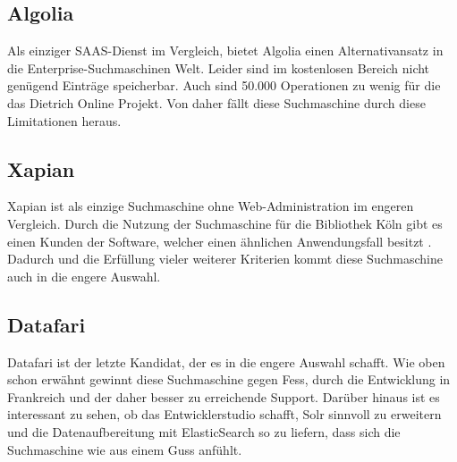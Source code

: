 \subsection{Algolia}

Als einziger SAAS-Dienst im Vergleich, bietet Algolia einen Alternativansatz in die Enterprise-Suchmaschinen Welt. Leider sind im kostenlosen Bereich nicht genügend Einträge speicherbar. Auch sind 50.000 Operationen zu wenig für die das Dietrich Online Projekt. Von daher fällt diese Suchmaschine durch diese Limitationen heraus. \cite{Algolia.2019}

\subsection{Xapian}

Xapian ist als einzige Suchmaschine ohne Web-Administration im engeren Vergleich. Durch die Nutzung der Suchmaschine für die Bibliothek Köln gibt es einen Kunden der Software, welcher einen ähnlichen Anwendungsfall besitzt \cite{Xapian.2019}. Dadurch und die Erfüllung vieler weiterer Kriterien kommt diese Suchmaschine auch in die engere Auswahl. \cite{XAP.2019}

\subsection{Datafari}

Datafari ist der letzte Kandidat, der es in die engere Auswahl schafft. Wie oben schon erwähnt gewinnt diese Suchmaschine gegen Fess, durch die Entwicklung in Frankreich und der daher besser zu erreichende Support. Darüber hinaus ist es interessant zu sehen, ob das Entwicklerstudio schafft, Solr sinnvoll zu erweitern und die Datenaufbereitung mit ElasticSearch so zu liefern, dass sich die Suchmaschine wie aus einem Guss anfühlt. \cite{Labs.b}